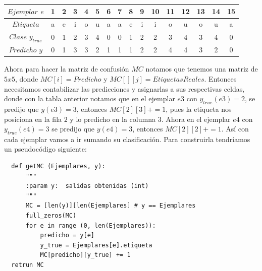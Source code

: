 \begin{description}
\begin{example}
\begin{center}
\begin{tabular}{c|ccccccccccccccc}

 $Ejemplar$ $e$     & 1 & 2 & 3 & 4 & 5 & 6 & 7 & 8 & 9 & 10 & 11 & 12 & 13 & 14 & 15 \\ \hline
 $Etiqueta $      & a & e & i & o & u & a & a & e & i & i  & o  & u  & o  & u & a \\ \hline
 $Clase$ $y_{true}$ & 0 & 1 & 2 & 3 & 4 & 0 & 0 & 1 & 2 & 2  & 3  & 4  & 3  & 4 & 0 \\ \hline
 $Predicho$ $y$     & 0 & 1 & 3 & 3 & 2 & 1 & 1 & 1 & 2 & 2  & 4  & 4  & 3  & 2 & 0 \\ \hline

\end{tabular}
\end{center}
\end{example}

 Ahora para hacer la matriz de confusión $MC$ notamos que tenemos una matriz de $5 x 5$, donde $MC[i]= Predicho$ y $MC[][j] = EtiquetasReales$. Entonces necesitamos contabilizar las predicciones y asignarlas a sus respectivas celdas, donde con la tabla anterior notamos que en el ejemplar $e3$ con $y_{true}(e3)= 2$, se predijo que $y(e3)=3$, entonces $MC[2][3] +=1$, pues la etiqueta nos posiciona en la fila $2$ y lo predicho en la columna $3$. Ahora en el ejemplar $e4$ con $y_{true}(e4)= 3$ se predijo que $y(e4)= 3$, entonces  $MC[2][2] +=1$. Así con cada ejemplar vamos a ir sumando su clasificación. Para construirla tendríamos un pseudocódigo siguiente:
 \begin{verbatim}
  def getMC (Ejemplares, y):
      """
      :param y:  salidas obtenidas (int)
      """
      MC = [len(y)][len(Ejemplares] # y == Ejemplares
      full_zeros(MC)
      for e in range (0, len(Ejemplares)):
          predicho = y[e]
          y_true = Ejemplares[e].etiqueta
          MC[predicho][y_true] += 1
  retrun MC
 \end{verbatim}


\end{description}
